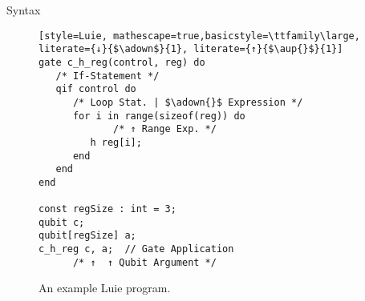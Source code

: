 \begin{frame}[fragile]{Syntax}
\begin{minipage}{.45\textwidth}
    \end{minipage}
    \begin{minipage}{.50\textwidth}
        \begin{figure}[htp]
            \centering     
            \begin{lstlisting}[style=Luie, mathescape=true,basicstyle=\ttfamily\large, literate={↓}{$\adown$}{1}, literate={↑}{$\aup{}$}{1}] 
gate c_h_reg(control, reg) do
   /* If-Statement */
   qif control do
      /* Loop Stat. | $\adown{}$ Expression */
      for i in range(sizeof(reg)) do
             /* ↑ Range Exp. */
         h reg[i];
      end
   end
end

const regSize : int = 3; 
qubit c;
qubit[regSize] a;        
c_h_reg c, a;  // Gate Application  
      /* ↑  ↑ Qubit Argument */                 
            \end{lstlisting}
            \caption{An example Luie program.}
        \end{figure}
    \end{minipage}
\end{frame}

%         


